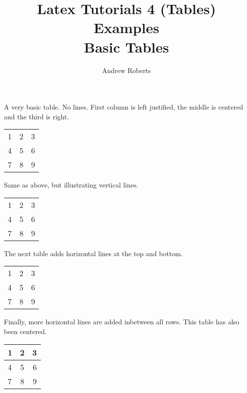 \documentclass{article}
\begin{document}
\title{Latex Tutorials 4 (Tables) Examples \\ Basic Tables}
\author{Andrew Roberts}
\maketitle

A very basic table. No lines. First column is left justified, the middle
is centered and the third is right.

\vspace{\baselineskip}
\begin{tabular}{ l c r }
	1 & 2 & 3 \\
	4 & 5 & 6 \\
	7 & 8 & 9 \\
\end{tabular}

\vspace{\baselineskip}

Same as above, but illustrating vertical lines.

\vspace{\baselineskip}
\begin{tabular}{ l | c || r |}
	1 & 2 & 3 \\
	4 & 5 & 6 \\
	7 & 8 & 9 \\
\end{tabular}

\vspace{\baselineskip}
The next table adds horizontal lines at the top and bottom.

\vspace{\baselineskip}
\begin{tabular}{ l | c || r | }
\hline
	1 & 2 & 3 \\
	4 & 5 & 6 \\
	7 & 8 & 9 \\
\hline
\end{tabular}

\vspace{\baselineskip}
Finally, more horizontal lines are added inbetween all rows. This table
has also been centered.

\begin{center}
	\begin{tabular}{ l | c || r | }
		\hline
		1 & 2 & 3 \\ \hline
		4 & 5 & 6 \\ \hline
		7 & 8 & 9 \\
	\hline
	\end{tabular}
\end{center}
\end{document}
